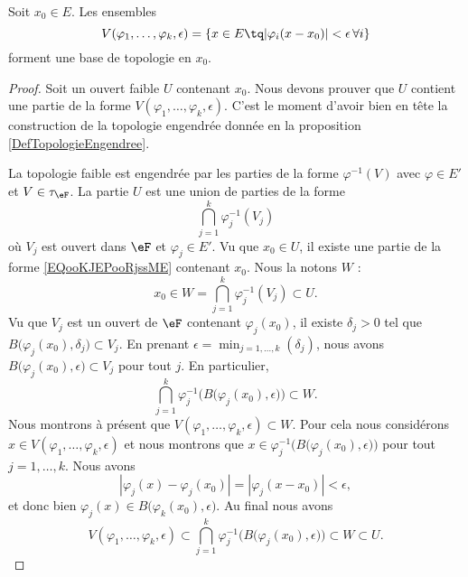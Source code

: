 \begin{lemma}
	Soit \( x_0\in E\). Les ensembles
	\begin{equation}
		V(\varphi_1,\ldots, \varphi_k,\epsilon)=\{ x\in E\tq | \varphi_i(x-x_0) |<\epsilon\,\forall i \}
	\end{equation}
	forment une base de topologie en \( x_0\).
\end{lemma}

\begin{proof}
	Soit un ouvert faible \( U\) contenant \( x_0\). Nous devons prouver que \( U\) contient une partie de la forme \( V(\varphi_1,\ldots, \varphi_k,\epsilon)\). C'est le moment d'avoir bien en tête la construction de la topologie engendrée donnée en la proposition \ref{DefTopologieEngendree}.

	La topologie faible est engendrée par les parties de la forme \( \varphi^{-1}(V)\) avec \( \varphi\in E'\) et \( V\in \tau_{\eF}\). La partie \( U\) est une union de parties de la forme
	\begin{equation}        \label{EQooKJEPooRjssME}
		\bigcap_{j=1}^k\varphi_j^{-1}(V_j)
	\end{equation}
	où \( V_j\) est ouvert dans \( \eF\) et \( \varphi_j\in E'\). Vu que \( x_0\in U\), il existe une partie de la forme \eqref{EQooKJEPooRjssME} contenant \( x_0\). Nous la notons \( W\) :
	\begin{equation}
		x_0\in W=\bigcap_{j=1}^k\varphi_j^{-1}(V_j)\subset U.
	\end{equation}
	Vu que \( V_j\) est un ouvert de \( \eF\) contenant \( \varphi_j(x_0)\), il existe \( \delta_j>0\) tel que \( B\big( \varphi_j(x_0),\delta_j \big)\subset V_j\). En prenant \( \epsilon=\min_{j=1,\ldots, k}(\delta_j)\), nous avons \( B\big( \varphi_j(x_0),\epsilon \big)\subset V_j\) pour tout \( j\). En particulier,
	\begin{equation}
		\bigcap_{j=1}^k\varphi_j^{-1}\Big( B\big(\varphi_j(x_0),\epsilon\big) \Big)\subset W.
	\end{equation}
	Nous montrons à présent que \( V(\varphi_1,\ldots, \varphi_k,\epsilon)\subset W\). Pour cela nous considérons \( x\in V(\varphi_1,\ldots, \varphi_k,\epsilon)\) et nous montrons que \( x\in\varphi_j^{-1}\Big( B\big( \varphi_j(x_0),\epsilon \big) \Big)\) pour tout \( j=1,\ldots, k\). Nous avons
	\begin{equation}
		| \varphi_j(x)-\varphi_j(x_0) |=| \varphi_j(x-x_0) |<\epsilon,
	\end{equation}
	et donc bien \( \varphi_j(x)\in B\big( \varphi_k(x_0),\epsilon \big)\). Au final nous avons
	\begin{equation}
		V(\varphi_1,\ldots, \varphi_k,\epsilon)\subset\bigcap_{j=1}^k\varphi_j^{-1}\Big( B\big( \varphi_j(x_0),\epsilon \big) \Big)\subset W\subset U.
	\end{equation}
\end{proof}


